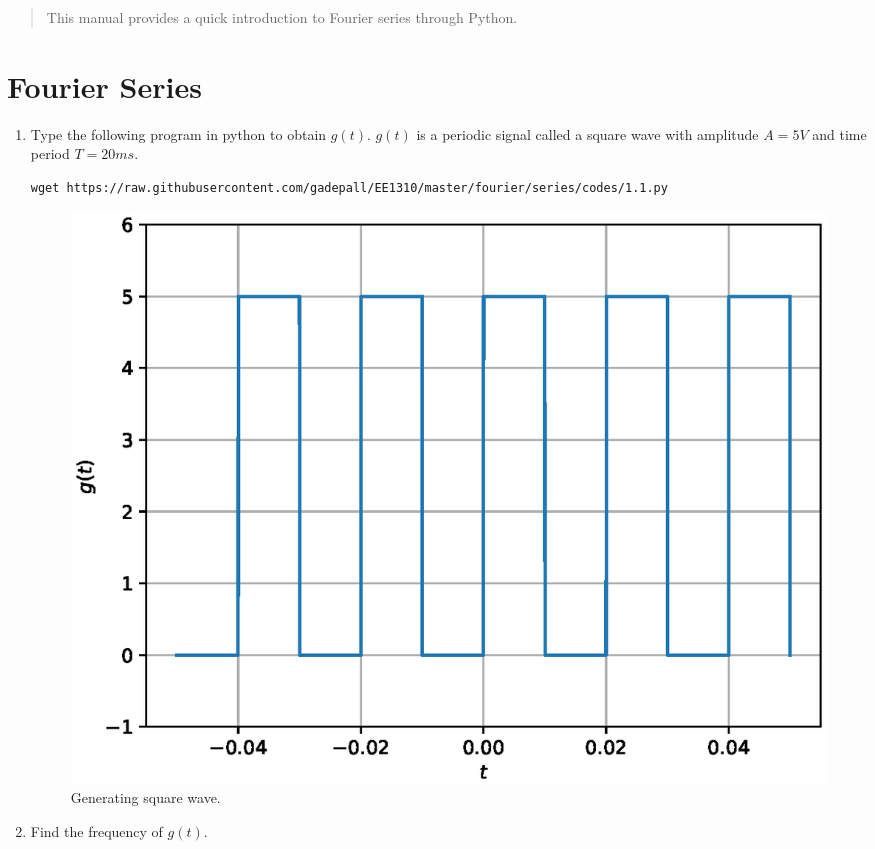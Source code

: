 \documentclass[journal,12pt,twocolumn]{IEEEtran}
\renewcommand\thesection{\arabic{section}}
\begin{document}
%
\IEEEpeerreviewmaketitle

\begin{abstract}
This manual provides a quick introduction to Fourier series through Python.
\end{abstract}
\section{Fourier Series}
\begin{enumerate}[label=\thesection.\arabic*
,ref=\thesection.\theenumi]

%
\item
Type the following program in python to obtain $g(t)$.  $g(t)$ is a periodic signal called a square wave with amplitude $A = 5V$ and time period $T=20 ms$.

%
\solution
\begin{lstlisting}
wget https://raw.githubusercontent.com/gadepall/EE1310/master/fourier/series/codes/1.1.py
\end{lstlisting}

%
\begin{figure}[!h]
\centering

\includegraphics[width=\columnwidth]{./figs/1.1.eps}
\caption{Generating square wave.}
\label{fig:1.1}
\end{figure}
%
\item
Find the frequency of $g(t)$.


\end{enumerate}
\end{document}
